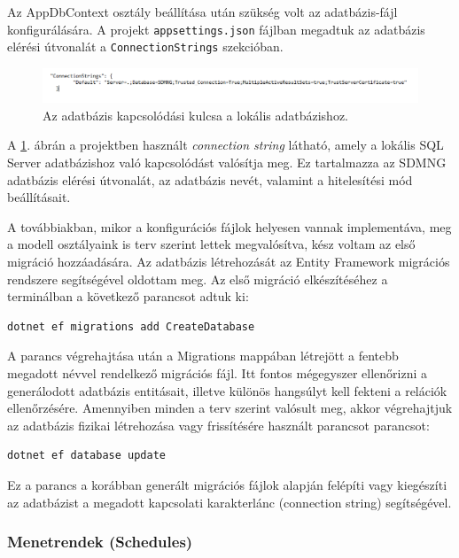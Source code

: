 Az AppDbContext osztály beállítása után szükség volt az adatbázis-fájl konfigurálására. A projekt \texttt{appsettings.json} fájlban megadtuk az adatbázis elérési útvonalát a \texttt{ConnectionStrings} szekcióban.

\begin{figure}[H]
\centering
\includegraphics[width=1\textwidth]{Szakdolgozat/Mellekletek/Connectionstring.PNG}
\caption{Az adatbázis kapcsolódási kulcsa a lokális adatbázishoz.}
\label{fig:connectionstring}
\end{figure}

A \ref{fig:connectionstring}. ábrán a projektben használt \textit{connection string} látható, amely a lokális SQL Server adatbázishoz való kapcsolódást valósítja meg. Ez tartalmazza az SDMNG adatbázis elérési útvonalát, az adatbázis nevét, valamint a hitelesítési mód beállításait.
\vspace{\baselineskip}

A továbbiakban, mikor a konfigurációs fájlok helyesen vannak implementáva, meg a modell osztályaink is terv szerint lettek megvalósítva, kész voltam az első migráció hozzáadására. Az adatbázis létrehozását az Entity Framework migrációs rendszere segítségével oldottam meg. Az első migráció elkészítéséhez a terminálban a következő parancsot adtuk ki: 
\begin{lstlisting}
dotnet ef migrations add CreateDatabase
\end{lstlisting}
A parancs végrehajtása után a Migrations mappában létrejött a fentebb megadott névvel rendelkező migrációs fájl. Itt fontos mégegyszer ellenőrizni a generálodott adatbázis entitásait, illetve különös hangsúlyt kell fekteni a relációk ellenőrzésére. Amennyiben minden a terv szerint valósult meg, akkor végrehajtjuk  az adatbázis fizikai létrehozása vagy frissítésére használt parancsot parancsot: 
\begin{lstlisting}
dotnet ef database update
\end{lstlisting}

Ez a parancs a korábban generált migrációs fájlok alapján felépíti vagy kiegészíti az adatbázist a megadott kapcsolati karakterlánc (connection string) segítségével.

\subsubsection{Menetrendek (Schedules)}



